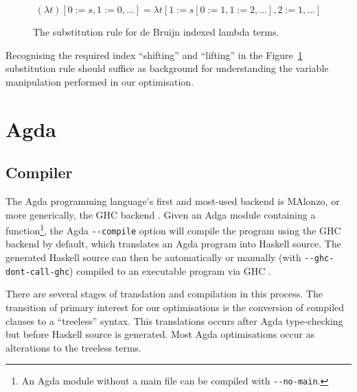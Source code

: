 \begin{figure}[h]
\begin{equation*}
(\lambda t)[0 := s, 1 := 0, ...] = \lambda t[1 := s[0 := 1, 1 := 2, ...], 2 := 1, ...]
\end{equation*}
\caption{The substitution rule for de Bruijn indexed lambda terms.}
\label{eq:debruijn_sub}
\end{figure}

Recognising the required index ``shifting'' and ``lifting'' in the Figure~\ref{eq:debruijn_sub} substitution rule should suffice as background for understanding the variable manipulation performed in our optimisation.

\section{Agda}
\label{sec:background_agda}

\subsection{Compiler}

The Agda programming language's first and most-used backend is MAlonzo, or more generically, the GHC backend \citep{benke2007}. Given an Adga module containing a  function\footnote{An Agda module without a main file can be compiled with \texttt{-{}-no-main}.}, the Agda \texttt{-{}-compile} option will compile the program using the GHC backend by default, which translates an Agda program into Haskell source. The generated Haskell source can then be automatically or manually (with \texttt{-{}-ghc-dont-call-ghc}) compiled to an executable program via GHC \citep{agdadocs}. %

There are several stages of translation and compilation in this process. The transition of primary interest for our optimisations is the conversion of compiled clauses to a ``treeless'' syntax. This translations occurs after Agda type-checking but before Haskell source is generated. Most Agda optimisations occur as alterations to the treeless terms.


